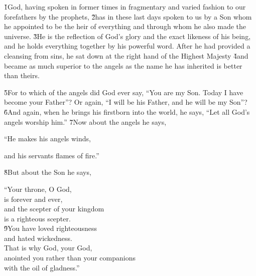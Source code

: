 


\v{1}God, having spoken in former times in fragmentary and varied fashion to our forefathers by the prophets, \v{2}has in these last days spoken to us by a Son whom he appointed to be the heir of everything and through whom he also made the universe. \v{3}He is the reflection of God's glory and the exact likeness of his being, and he holds everything together by his powerful word. After he had provided a cleansing from sins, he sat down at the right hand of the Highest Majesty \v{4}and became as much superior to the angels as the name he has inherited is better than theirs.

\v{5}For to which of the angels did God ever say, ``You are my Son. Today I have become your Father''? Or again, ``I will be his Father, and he will be my Son''? \v{6}And again, when he brings his firstborn into the world, he says, ``Let all God's angels worship him.'' \v{7}Now about the angels he says,

\begin{poetry}
\poeml ``He makes his angels winds,
\end{poetry}

and his servants flames of fire.''

\v{8}But about the Son he says,

\begin{poetry}
\poeml ``Your throne, O God, \\
\poemll    is forever and ever, \\
\poeml and the scepter of your kingdom \\
\poemll    is a righteous scepter. \\
\poeml \v{9}You have loved righteousness \\
\poemll    and hated wickedness. \\
\poeml That is why God, your God, \\
\poemll    anointed you rather than your companions \\
\poemlll       with the oil of gladness.''
\end{poetry}

